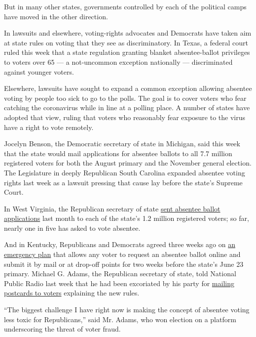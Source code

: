 But in many other states, governments controlled by each of the
political camps have moved in the other direction.

In lawsuits and elsewhere, voting-rights advocates and Democrats have
taken aim at state rules on voting that they see as discriminatory. In
Texas, a federal court ruled this week that a state regulation granting
blanket absentee-ballot privileges to voters over 65 --- a not-uncommon
exception nationally --- discriminated against younger voters.

Elsewhere, lawsuits have sought to expand a common exception allowing
absentee voting by people too sick to go to the polls. The goal is to
cover voters who fear catching the coronavirus while in line at a
polling place. A number of states have adopted that view, ruling that
voters who reasonably fear exposure to the virus have a right to vote
remotely.

Jocelyn Benson, the Democratic secretary of state in Michigan, said this
week that the state would mail applications for absentee ballots to all
7.7 million registered voters for both the August primary and the
November general election. The Legislature in deeply Republican South
Carolina expanded absentee voting rights last week as a lawsuit pressing
that cause lay before the state's Supreme Court.

In West Virginia, the Republican secretary of state
\href{https://www.wsaz.com/content/news/More-room-for-voter-fraud-with-WVa-absentee-ballots-569763811.html}{sent
absentee ballot applications} last month to each of the state's 1.2
million registered voters; so far, nearly one in five has asked to vote
absentee.

And in Kentucky, Republicans and Democrats agreed three weeks ago on
\href{https://governor.ky.gov/attachments/20200424_Executive-Order_2020-296_SOE-Relating-to-Elections.pdf}{an
emergency plan} that allows any voter to request an absentee ballot
online and submit it by mail or at drop-off points for two weeks before
the state's June 23 primary. Michael G. Adams, the Republican secretary
of state, told National Public Radio last week that he had been
excoriated by his party for
\href{https://www.npr.org/2020/05/15/856189149/it-s-partly-on-me-gop-official-says-fraud-warnings-hamper-vote-by-mail-push}{mailing
postcards to voters} explaining the new rules.

``The biggest challenge I have right now is making the concept of
absentee voting less toxic for Republicans,'' said Mr. Adams, who won
election on a platform underscoring the threat of voter fraud.

